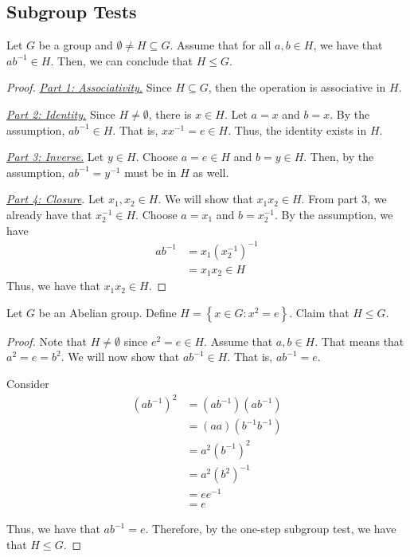 \subsection{Subgroup Tests}

\begin{theorem}
    Let \(G\) be a group and \(\emptyset \neq H \subseteq G\). Assume that for all \(a, b \in H\), we have that \(ab^{-1} \in H\). Then, we can conclude that \(H \leq G\).
\end{theorem}

\begin{proof}
    \phantom{Part 0}

    \underline{\textit{Part 1: Associativity.}} Since \(H \subseteq G\), then the operation is associative in \(H\). 

    \underline{\textit{Part 2: Identity.}} Since \(H \neq \emptyset\), there is \(x \in H\). Let \(a = x\) and \(b = x\). By the assumption, \(ab^{-1} \in H\). That is, \(xx^{-1} = e \in H\). Thus, the identity exists in \(H\).

    \underline{\textit{Part 3: Inverse.}} Let \(y \in H\). Choose \(a = e \in H\) and \(b = y \in H\). Then, by the assumption, \(ab^{-1} = y^{-1}\) must be in \(H\) as well.

    \underline{\textit{Part 4: Closure}}. Let \(x_1, x_2 \in H\). We will show that \(x_1x_2 \in H\). From part 3, we already have that \(x_2^{-1} \in H\). Choose \(a = x_1\) and \(b = x_2^{-1}\). By the assumption, we have
    \[
    \begin{aligned}
        ab^{-1} &= x_1(x_2^{-1})^{-1} \\
                &= x_1x_2 \in H
    \end{aligned}
    \]
    Thus, we have that \(x_1x_2 \in H\).
\end{proof}

\begin{nexample}
    Let \(G\) be an Abelian group. Define \(H = \left\{x \in G : x^2 = e\right\}\). Claim that \(H \leq G\).

    \begin{proof}
        Note that \(H \neq \emptyset\) since \(e^2 = e \in H\). Assume that \(a, b \in H\). That means that \(a^2 = e = b^2\). We will now show that \(ab^{-1} \in H\). That is, \(ab^{-1} = e\).

        Consider
        \[
        \begin{aligned}
            (ab^{-1})^2 &= (ab^{-1})(ab^{-1})  \\
                        &= (aa)(b^{-1}b^{-1}) \\
                        &= a^2(b^{-1})^2 \\
                        &= a^2(b^{2})^{-1} \\
                        &= ee^{-1} \\
                        &= e
        \end{aligned}
        \]

        Thus, we have that \(ab^{-1} = e\). Therefore, by the one-step subgroup test, we have that \(H \leq G\).
    \end{proof}
\end{nexample}

